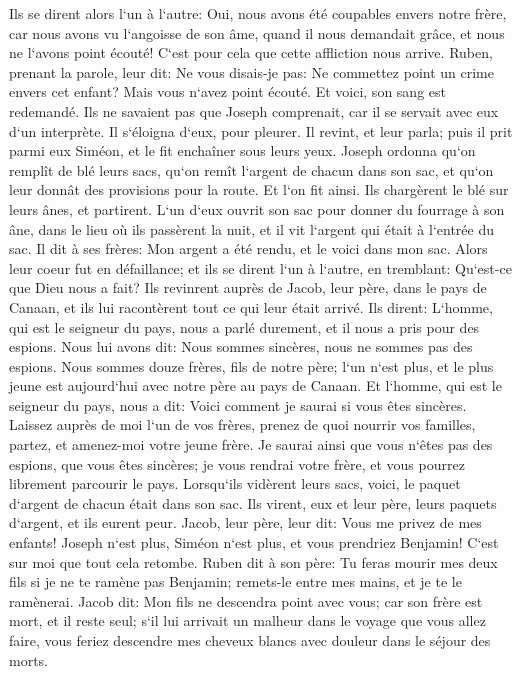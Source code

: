\verse Ils se dirent alors l`un à l`autre: Oui, nous avons été coupables envers notre frère, car nous avons vu l`angoisse de son âme, quand il nous demandait grâce, et nous ne l`avons point écouté! C`est pour cela que cette affliction nous arrive. 
\verse Ruben, prenant la parole, leur dit: Ne vous disais-je pas: Ne commettez point un crime envers cet enfant? Mais vous n`avez point écouté. Et voici, son sang est redemandé. 
\verse Ils ne savaient pas que Joseph comprenait, car il se servait avec eux d`un interprète. 
\verse Il s`éloigna d`eux, pour pleurer. Il revint, et leur parla; puis il prit parmi eux Siméon, et le fit enchaîner sous leurs yeux. 
\verse Joseph ordonna qu`on remplît de blé leurs sacs, qu`on remît l`argent de chacun dans son sac, et qu`on leur donnât des provisions pour la route. Et l`on fit ainsi. 
\verse Ils chargèrent le blé sur leurs ânes, et partirent. 
\verse L`un d`eux ouvrit son sac pour donner du fourrage à son âne, dans le lieu où ils passèrent la nuit, et il vit l`argent qui était à l`entrée du sac. 
\verse Il dit à ses frères: Mon argent a été rendu, et le voici dans mon sac. Alors leur coeur fut en défaillance; et ils se dirent l`un à l`autre, en tremblant: Qu`est-ce que Dieu nous a fait? 
\verse Ils revinrent auprès de Jacob, leur père, dans le pays de Canaan, et ils lui racontèrent tout ce qui leur était arrivé. Ils dirent: 
\verse L`homme, qui est le seigneur du pays, nous a parlé durement, et il nous a pris pour des espions. 
\verse Nous lui avons dit: Nous sommes sincères, nous ne sommes pas des espions. 
\verse Nous sommes douze frères, fils de notre père; l`un n`est plus, et le plus jeune est aujourd`hui avec notre père au pays de Canaan. 
\verse Et l`homme, qui est le seigneur du pays, nous a dit: Voici comment je saurai si vous êtes sincères. Laissez auprès de moi l`un de vos frères, prenez de quoi nourrir vos familles, partez, et amenez-moi votre jeune frère. 
\verse Je saurai ainsi que vous n`êtes pas des espions, que vous êtes sincères; je vous rendrai votre frère, et vous pourrez librement parcourir le pays. 
\verse Lorsqu`ils vidèrent leurs sacs, voici, le paquet d`argent de chacun était dans son sac. Ils virent, eux et leur père, leurs paquets d`argent, et ils eurent peur. 
\verse Jacob, leur père, leur dit: Vous me privez de mes enfants! Joseph n`est plus, Siméon n`est plus, et vous prendriez Benjamin! C`est sur moi que tout cela retombe. 
\verse Ruben dit à son père: Tu feras mourir mes deux fils si je ne te ramène pas Benjamin; remets-le entre mes mains, et je te le ramènerai. 
\verse Jacob dit: Mon fils ne descendra point avec vous; car son frère est mort, et il reste seul; s`il lui arrivait un malheur dans le voyage que vous allez faire, vous feriez descendre mes cheveux blancs avec douleur dans le séjour des morts. 

